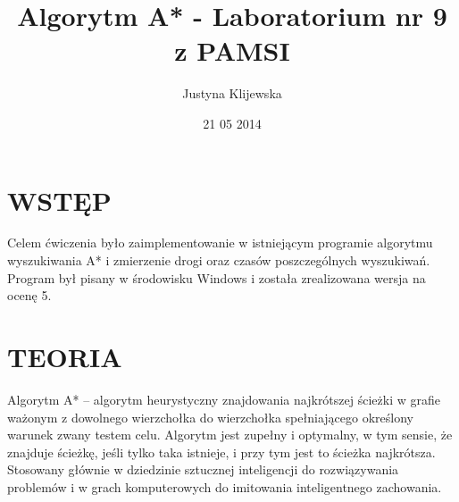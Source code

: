 \documentclass[11pt]{article}
\begin{document}
\begin{titlepage}
\title{Algorytm A* - Laboratorium nr 9 z PAMSI}
\author{Justyna Klijewska}
\date{21 05 2014}
\maketitle
\end{titlepage}
\section{WSTĘP}
Celem ćwiczenia było zaimplementowanie w istniejącym programie algorytmu wyszukiwania A* i zmierzenie drogi oraz czasów poszczególnych wyszukiwań. Program był pisany w środowisku Windows i została zrealizowana wersja na ocenę 5.
\section{TEORIA}
Algorytm A* – algorytm heurystyczny znajdowania najkrótszej ścieżki w grafie ważonym z dowolnego wierzchołka do wierzchołka spełniającego określony warunek zwany testem celu. Algorytm jest zupełny i optymalny, w tym sensie, że znajduje ścieżkę, jeśli tylko taka istnieje, i przy tym jest to ścieżka najkrótsza. Stosowany głównie w dziedzinie sztucznej inteligencji do rozwiązywania problemów i w grach komputerowych do imitowania inteligentnego zachowania. \\
\end{document}
